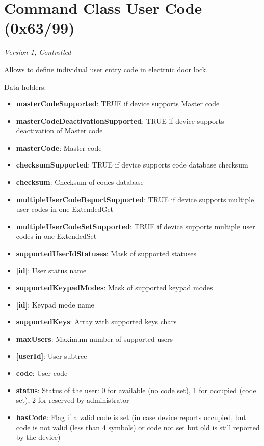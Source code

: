 \section{Command Class User Code (0x63/99)}

\textit{Version 1, Controlled}
\newline

Allows to define individual user entry code in electrnic door lock.
\newline

\noindent
Data holders:

\begin{itemize}
\item \textbf{masterCodeSupported}: TRUE if device supports Master code
\item \textbf{masterCodeDeactivationSupported}: TRUE if device supports deactivation of Master code
\item \textbf{masterCode}: Master code
\item \textbf{checksumSupported}: TRUE if device supports code database checksum
\item \textbf{checksum}: Checksum of codes database
\item \textbf{multipleUserCodeReportSupported}: TRUE if device supports multiple user codes in one ExtendedGet
\item \textbf{multipleUserCodeSetSupported}: TRUE if device supports multiple user codes in one ExtendedSet
\item \textbf{supportedUserIdStatuses}: Mask of supported statuses
\item \qquad\textbf{[id]}: User status name
\item \textbf{supportedKeypadModes}: Mask of supported keypad modes
\item \qquad\textbf{[id]}: Keypad mode name
\item \textbf{supportedKeys}: Array with supported keys chars
\item \textbf{maxUsers}: Maximum number of supported users
\item \textbf{[userId]}: User subtree
\item \qquad\textbf{code}: User code
\item \qquad\textbf{status}: Status of the user: 0 for available (no code set), 1 for occupied (code set), 2 for reserved by administrator
\item \qquad\textbf{hasCode}: Flag if a valid code is set (in case device reports occupied, but code is not valid (less than 4 symbols) or code not set but old is still reported by the device)
\end{itemize}


